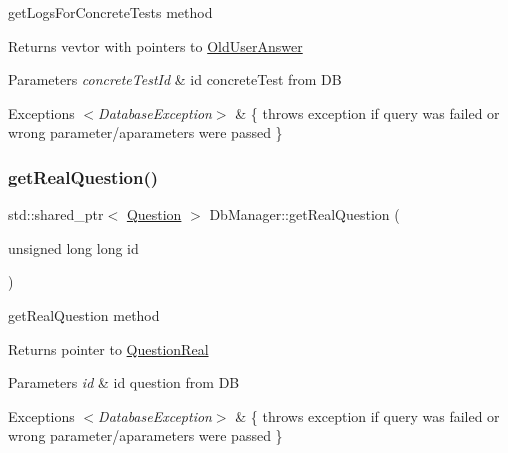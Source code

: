 get\+Logs\+For\+Concrete\+Tests method 

\begin{DoxyReturn}{Returns}
vevtor with pointers to \hyperlink{class_old_user_answer}{Old\+User\+Answer} 
\end{DoxyReturn}

\begin{DoxyParams}{Parameters}
{\em concrete\+Test\+Id} & id concrete\+Test from DB \\
\hline
\end{DoxyParams}

\begin{DoxyExceptions}{Exceptions}
{\em $<$\+Database\+Exception$>$} & \{ throws exception if query was failed or wrong parameter/aparameters were passed \} \\
\hline
\end{DoxyExceptions}
\mbox{\label{class_db_manager_ac703dfee1ede761a035076bdda1afb3a}} 
\subsubsection{\texorpdfstring{get\+Real\+Question()}{getRealQuestion()}}
{\footnotesize\ttfamily std\+::shared\+\_\+ptr$<$ \hyperlink{class_question}{Question} $>$ Db\+Manager\+::get\+Real\+Question (\begin{DoxyParamCaption}\item[{unsigned long long}]{id }\end{DoxyParamCaption})}



get\+Real\+Question method 

\begin{DoxyReturn}{Returns}
pointer to \hyperlink{class_question_real}{Question\+Real} 
\end{DoxyReturn}

\begin{DoxyParams}{Parameters}
{\em id} & id question from DB \\
\hline
\end{DoxyParams}

\begin{DoxyExceptions}{Exceptions}
{\em $<$\+Database\+Exception$>$} & \{ throws exception if query was failed or wrong parameter/aparameters were passed \} \\
\hline
\end{DoxyExceptions}
\mbox{\label{class_db_manager_aca4a4621da1651f4da64adddd9811cb1}} 
